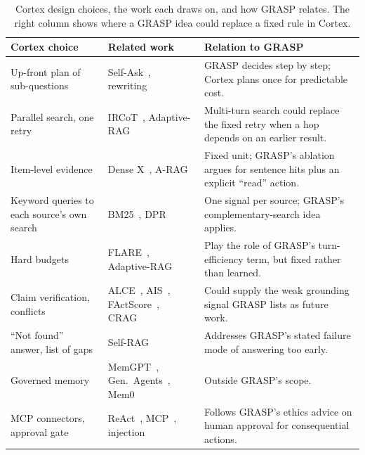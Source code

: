 \documentclass[conference]{IEEEtran}
\begin{document}
\begin{table}[t]
\centering
\caption{Cortex design choices, the work each draws on, and how GRASP relates. The right column shows where a GRASP idea could replace a fixed rule in Cortex.}
\label{tab:map}
\scriptsize
\setlength{\tabcolsep}{3pt}
\renewcommand{\arraystretch}{1.12}
\begin{tabular}{@{}p{1.6cm}p{1.95cm}p{4.3cm}@{}}
\toprule
\textbf{Cortex choice} & \textbf{Related work} & \textbf{Relation to GRASP} \\
\midrule
Up-front plan of sub-questions & Self-Ask~\cite{press2023selfask}, rewriting~\cite{ma2023rewrite} & GRASP decides step by step; Cortex plans once for predictable cost. \\
Parallel search, one retry & IRCoT~\cite{trivedi2023ircot}, Adaptive-RAG~\cite{jeong2024adaptiverag} & Multi-turn search could replace the fixed retry when a hop depends on an earlier result. \\
Item-level evidence & Dense X~\cite{chen2024densex}, A-RAG~\cite{du2026arag} & Fixed unit; GRASP's ablation argues for sentence hits plus an explicit ``read'' action. \\
Keyword queries to each source's own search & BM25~\cite{robertson2009bm25}, DPR~\cite{karpukhin2020dpr} & One signal per source; GRASP's complementary-search idea applies. \\
Hard budgets & FLARE~\cite{jiang2023flare}, Adaptive-RAG~\cite{jeong2024adaptiverag} & Play the role of GRASP's turn-efficiency term, but fixed rather than learned. \\
Claim verification, conflicts & ALCE~\cite{gao2023alce}, AIS~\cite{rashkin2023ais}, FActScore~\cite{min2023factscore}, CRAG~\cite{yan2024crag} & Could supply the weak grounding signal GRASP lists as future work. \\
``Not found'' answer, list of gaps & Self-RAG~\cite{asai2024selfrag} & Addresses GRASP's stated failure mode of answering too early. \\
Governed memory & MemGPT~\cite{packer2023memgpt}, Gen.\ Agents~\cite{park2023generative}, Mem0~\cite{chhikara2025mem0} & Outside GRASP's scope. \\
MCP connectors, approval gate & ReAct~\cite{yao2023react}, MCP~\cite{anthropic2024mcp,hou2025mcp}, injection~\cite{greshake2023injection} & Follows GRASP's ethics advice on human approval for consequential actions. \\
\bottomrule
\end{tabular}
\end{table}
\end{document}
